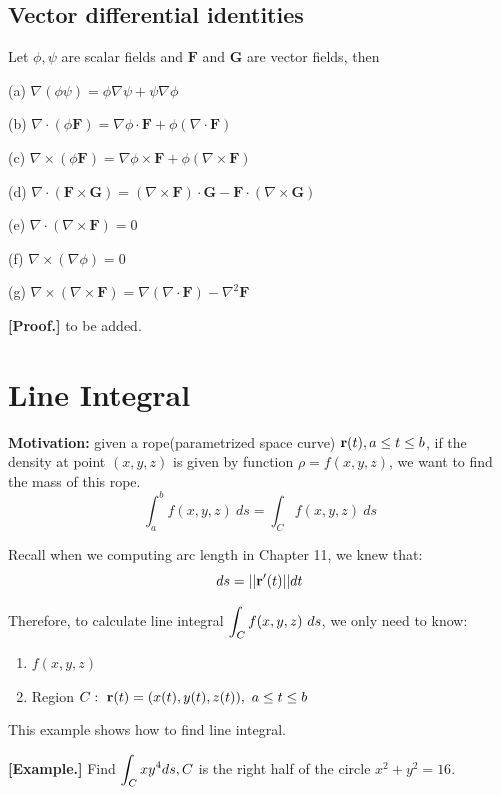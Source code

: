 \documentclass[11pt, a4paper]{MATH2023}
\newcommand{\eg}{\textbf{[Example.] }}
\newcommand{\rr}{{\bf r}}
\begin{document}
\begin{spacing}{1.3}
    \newpage
    \subsection{Vector differential identities}
    Let $\phi, \psi$ are scalar fields and $\mathbf{F}$ and $\mathbf{G}$ are vector fields, then

    (a) $\nabla(\phi \psi)=\phi \nabla \psi+\psi \nabla \phi$

    (b) $\nabla \cdot(\phi \mathbf{F})=\nabla \phi \cdot \mathbf{F}+\phi(\nabla \cdot \mathbf{F})$

    (c) $\nabla \times(\phi \mathbf{F})=\nabla \phi \times \mathbf{F}+\phi(\nabla \times \mathbf{F})$

    (d) $\nabla \cdot(\mathbf{F} \times \mathbf{G})=(\nabla \times \mathbf{F}) \cdot \mathbf{G}-\mathbf{F} \cdot(\nabla \times \mathbf{G})$
    
    (e) $\nabla \cdot(\nabla \times \mathbf{F})=0$
    
    (f) $\nabla \times(\nabla \phi)=0$
    
    (g) $\nabla \times(\nabla \times \mathbf{F})=\nabla(\nabla \cdot \mathbf{F})-\nabla^{2} \mathbf{F}$

    \vspace{0.2in}
    {\bf [Proof.]} {\blue to be added.}



    \newpage
    \section{Line Integral}
    {\bf Motivation:} given a rope(parametrized space curve) $\rr(t), a\le t\le b$, if the density at 
    point $(x,y,z)$ is given by function $\rho =f(x,y,z)$, we want to find the mass of this rope.
    $$\int_a^b f(x,y,z)\ ds=\int_C f(x,y,z)\ ds$$

    Recall when we computing arc length in Chapter 11, we knew that: 
    $$ds=||\rr'(t)|| dt$$

    Therefore, to calculate line integral $\displaystyle \int_C f(x,y,z)\ ds$, we only need to know: 
    \begin{enumerate}
        \item $f(x,y,z)$
        \item Region $C:\ \rr(t)=(x(t), y(t), z(t)),\ a\le t\le b$
    \end{enumerate}

    {\blue This example shows how to find line integral.}

    \eg Find $\displaystyle \int_{C} x y^{4} d s, C$ is the right half of the circle $x^{2}+y^{2}=16$.


\end{spacing}
\end{document}
